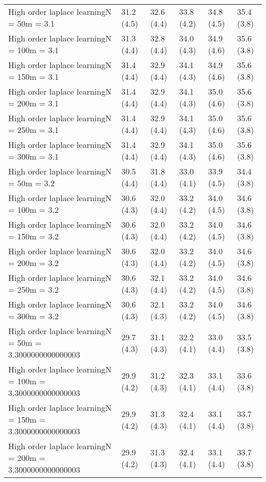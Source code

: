 \documentclass{article}
\begin{document}
\begin{table*}[t!]
\begin{center}
\begin{small}
\begin{sc}
\begin{tabular}{llllll}
High order laplace learningN = 50m = 3.1&31.2 (4.5)      &32.6 (4.4)      &33.8 (4.2)      &34.8 (4.5)      &35.4 (3.8)      \\
High order laplace learningN = 100m = 3.1&31.3 (4.4)      &32.8 (4.4)      &34.0 (4.3)      &34.9 (4.6)      &35.6 (3.8)      \\
High order laplace learningN = 150m = 3.1&31.4 (4.4)      &32.9 (4.4)      &34.1 (4.3)      &34.9 (4.6)      &35.6 (3.8)      \\
High order laplace learningN = 200m = 3.1&31.4 (4.4)      &32.9 (4.4)      &34.1 (4.3)      &35.0 (4.6)      &35.6 (3.8)      \\
High order laplace learningN = 250m = 3.1&31.4 (4.4)      &32.9 (4.4)      &34.1 (4.3)      &35.0 (4.6)      &35.6 (3.8)      \\
High order laplace learningN = 300m = 3.1&31.4 (4.4)      &32.9 (4.4)      &34.1 (4.3)      &35.0 (4.6)      &35.6 (3.8)      \\
High order laplace learningN = 50m = 3.2&30.5 (4.4)      &31.8 (4.4)      &33.0 (4.1)      &33.9 (4.5)      &34.4 (3.8)      \\
High order laplace learningN = 100m = 3.2&30.6 (4.3)      &32.0 (4.4)      &33.2 (4.2)      &34.0 (4.5)      &34.6 (3.8)      \\
High order laplace learningN = 150m = 3.2&30.6 (4.3)      &32.0 (4.4)      &33.2 (4.2)      &34.0 (4.5)      &34.6 (3.8)      \\
High order laplace learningN = 200m = 3.2&30.6 (4.3)      &32.0 (4.4)      &33.2 (4.2)      &34.0 (4.5)      &34.6 (3.8)      \\
High order laplace learningN = 250m = 3.2&30.6 (4.3)      &32.1 (4.4)      &33.2 (4.2)      &34.0 (4.5)      &34.6 (3.8)      \\
High order laplace learningN = 300m = 3.2&30.6 (4.3)      &32.1 (4.3)      &33.2 (4.2)      &34.0 (4.5)      &34.6 (3.8)      \\
High order laplace learningN = 50m = 3.3000000000000003&29.7 (4.3)      &31.1 (4.3)      &32.2 (4.1)      &33.0 (4.4)      &33.5 (3.8)      \\
High order laplace learningN = 100m = 3.3000000000000003&29.9 (4.2)      &31.2 (4.3)      &32.3 (4.1)      &33.1 (4.4)      &33.6 (3.8)      \\
High order laplace learningN = 150m = 3.3000000000000003&29.9 (4.2)      &31.3 (4.3)      &32.4 (4.1)      &33.1 (4.4)      &33.7 (3.8)      \\
High order laplace learningN = 200m = 3.3000000000000003&29.9 (4.2)      &31.3 (4.3)      &32.4 (4.1)      &33.1 (4.4)      &33.7 (3.8)      \\

\end{tabular}
\end{sc}
\end{small}
\end{center}
\end{table*}
\end{document}
